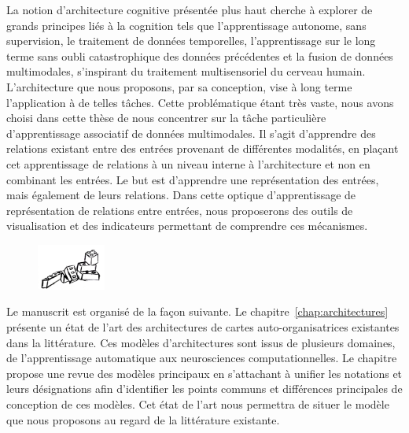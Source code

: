 La notion d'architecture cognitive présentée plus haut cherche à explorer de grands principes liés à la cognition tels que l'apprentissage autonome, sans supervision, le traitement de données temporelles, l'apprentissage sur le long terme sans oubli catastrophique des données précédentes et la fusion de données multimodales, s'inspirant du traitement multisensoriel du cerveau humain.
L'architecture que nous proposons, par sa conception, vise à long terme l'application à de telles tâches. Cette problématique étant très vaste, nous avons choisi dans cette thèse de nous concentrer sur la tâche particulière d'apprentissage associatif de données multimodales. 
Il s'agit d'apprendre des relations existant entre des entrées provenant de différentes modalités, en plaçant cet apprentissage de relations à un niveau interne à l'architecture et non en combinant les entrées. Le but est d'apprendre une représentation des entrées, mais également de leurs relations.
Dans cette optique d'apprentissage de représentation de relations entre entrées, nous proposerons des outils de visualisation et des indicateurs permettant de comprendre ces mécanismes.

 \begin{center}
 


\begin{figure}[h!]
    \vspace{1cm}
    \centering\includegraphics[width=0.2\textwidth]{lego2.jpg}
    \vspace{1cm}
\end{figure}
\end{center}

Le manuscrit est organisé de la façon suivante.
Le chapitre~\ref{chap:architectures} présente un état de l'art des architectures de cartes auto-organisatrices existantes dans la littérature. Ces modèles d'architectures sont issus de plusieurs domaines, de l'apprentissage automatique aux neurosciences computationnelles.
Le chapitre propose une revue des modèles principaux en s'attachant à unifier les notations et leurs désignations afin d'identifier les points communs et différences principales de conception de ces modèles.
Cet état de l'art nous permettra de situer le modèle que nous proposons au regard de la littérature existante.

